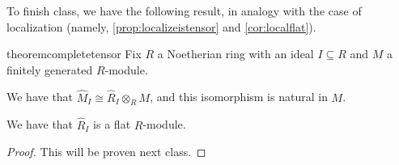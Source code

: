 To finish class, we have the following result, in analogy with the case of localization (namely, \autoref{prop:localizeistensor} and \autoref{cor:localflat}).
\begin{restatable}{theorem}{completetensor}
	Fix $R$ a Noetherian ring with an ideal $I\subseteq R$ and $M$ a finitely generated $R$-module.
	\begin{listalph}
		\item We have that $\widehat M_I\cong\widehat R_I\otimes_RM$, and this isomorphism is natural in $M$.
		\item We have that $\widehat R_I$ is a flat $R$-module.
	\end{listalph}
\end{restatable}
\begin{proof}
	This will be proven next class.
\end{proof}